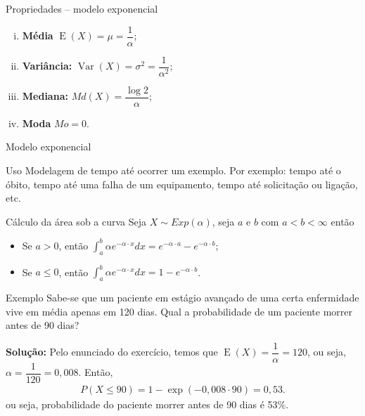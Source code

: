 \documentclass[9pt]{beamer}
\DeclareMathOperator{\espe}{E}
\DeclareMathOperator{\vari}{Var}
\begin{document}
\begin{frame}{Propriedades -- modelo exponencial}
\begin{enumerate}[i.]
 \item \textbf{Média} $\espe(X) = \mu = \dfrac{1}{\alpha}$;
 \vfill
 
 \item \textbf{Variância:} $\vari(X) = \sigma^2 = \dfrac{1}{\alpha^2}$;
 \vfill
 
 \item \textbf{Mediana:} $Md(X) = \dfrac{\log 2}{\alpha}$;
 \vfill
 
 \item \textbf{Moda} $Mo = 0$.
\end{enumerate}

\end{frame}


\begin{frame}{Modelo exponencial}
 \begin{block}{Uso}
  Modelagem de tempo até ocorrer um exemplo. Por exemplo: tempo até o óbito, tempo até uma falha de um equipamento, tempo até solicitação ou ligação, etc.
 \end{block} 
\vfill
 
 \begin{block}{Cálculo da área sob a curva}
 Seja $X \sim Exp(\alpha)$, seja $a$ e $b$ com $a < b < \infty$ então
  \begin{itemize}
   \item Se $a > 0$, então $\int_{a}^{b} \alpha e^{-\alpha \cdot x} dx = e^{-\alpha\cdot a} - e^{-\alpha\cdot b}$;
   \vfill
   
   \item Se $a \leq 0$, então $\int_{a}^{b} \alpha e^{-\alpha \cdot x} dx = 1 - e^{-\alpha\cdot b}$.
  \end{itemize}

 \end{block}

\end{frame}


\begin{frame}{Exemplo}
  Sabe-se que um paciente em estágio avançado de uma certa enfermidade vive em média apenas em 120 dias. Qual a probabilidade de um paciente morrer antes de 90 dias?
  \vfill
 
 \textbf{Solução:}
 Pelo enunciado do exercício, temos que $\espe(X) = \dfrac{1}{\alpha} =  120$, ou seja, $\alpha = \dfrac{1}{120} = 0,008$. Então,
 \begin{align*}
  P(X \leq 90) = 1 - \exp (-0,008 \cdot 90) = 0,53.
 \end{align*}
  ou seja,  probabilidade do paciente morrer antes de 90 dias é 53\%.
\end{frame}
\end{document}
